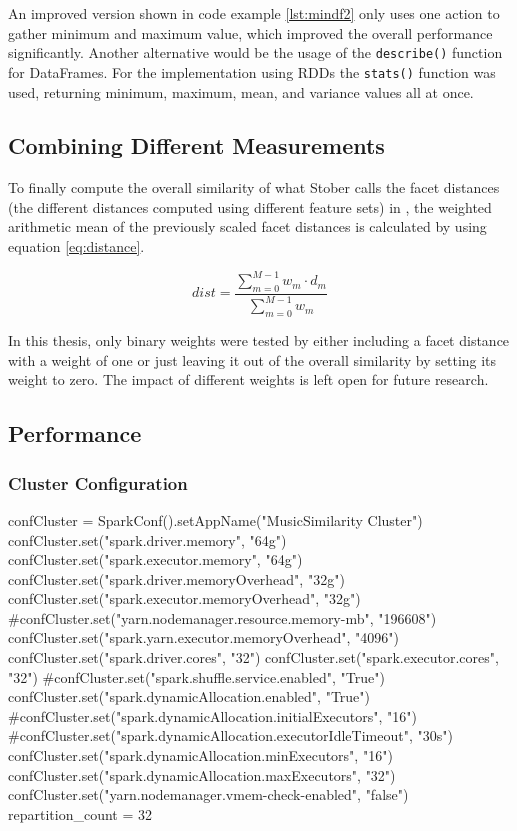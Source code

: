 \noindent An improved version shown in code example \ref{lst:mindf2} only uses one action to gather minimum and maximum value, which improved the overall performance significantly. 
\noindent Another alternative would be the usage of the \lstinline{describe()} function for DataFrames. For the implementation using RDDs the \lstinline{stats()} function was used, returning minimum, maximum, mean, and variance values all at once. 

\subsection{Combining Different Measurements}\label{weighedsum}

To finally compute the overall similarity of what Stober calls the facet distances (the different distances computed using different feature sets) in \cite[pp. 543ff]{musicdata}, the weighted arithmetic mean of the previously scaled facet distances is calculated by using equation \ref{eq:distance}.

\begin{equation} \label{eq:distance}
dist = \frac{\sum_{m = 0}^{M - 1}{w_m \cdot d_m}}{\sum_{m = 0}^{M - 1}{w_m}}
\end{equation}

\noindent In this thesis, only binary weights were tested by either including a facet distance with a weight of one or just leaving it out of the overall similarity by setting its weight to zero. The impact of different weights is left open for future research. 

\subsection{Performance}\label{sparkperf}

\subsubsection{Cluster Configuration} %

\begin{pythonCode}[frame=single,label={lst:clust},caption={cluster setup},captionpos=b]
confCluster = SparkConf().setAppName("MusicSimilarity Cluster")
confCluster.set("spark.driver.memory", "64g")
confCluster.set("spark.executor.memory", "64g")
confCluster.set("spark.driver.memoryOverhead", "32g")
confCluster.set("spark.executor.memoryOverhead", "32g")
#confCluster.set("yarn.nodemanager.resource.memory-mb", "196608")
confCluster.set("spark.yarn.executor.memoryOverhead", "4096")
confCluster.set("spark.driver.cores", "32")
confCluster.set("spark.executor.cores", "32")
#confCluster.set("spark.shuffle.service.enabled", "True")
confCluster.set("spark.dynamicAllocation.enabled", "True")
#confCluster.set("spark.dynamicAllocation.initialExecutors", "16")
#confCluster.set("spark.dynamicAllocation.executorIdleTimeout", "30s")	
confCluster.set("spark.dynamicAllocation.minExecutors", "16")
confCluster.set("spark.dynamicAllocation.maxExecutors", "32")
confCluster.set("yarn.nodemanager.vmem-check-enabled", "false")
repartition_count = 32
\end{pythonCode}

